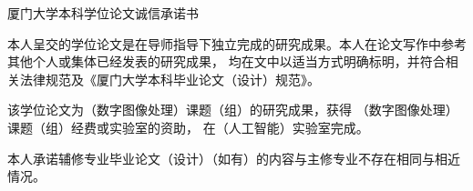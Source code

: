 \thispagestyle{empty}
{\sanhao \bfseries \centerline{厦门大学本科学位论文诚信承诺书}}

{\sihao
    \vspace{21pt}

	本人呈交的学位论文是在导师指导下独立完成的研究成果。本人在论文写作中参考其他个人或集体已经发表的研究成果，
    均在文中以适当方式明确标明，并符合相关法律规范及《厦门大学本科毕业论文（设计）规范》。
	
	该学位论文为（数字图像处理）课题（组）的研究成果，获得
	（数字图像处理）课题（组）经费或实验室的资助，
	在（人工智能）实验室完成。
	
	本人承诺辅修专业毕业论文（设计）（如有）的内容与主修专业不存在相同与相近情况。
	
	\vspace{42pt}
	

}	